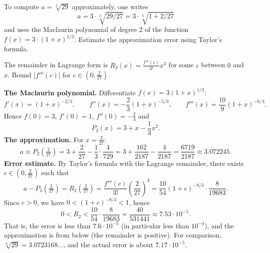 
\begin{question}
To compute $a=\sqrt[3]{29}$ approximately, one writes
\[ a=3\cdot\sqrt[3]{29/27}=3\cdot\sqrt[3]{1+2/27} \]
and uses the Maclaurin polynomial of degree 2 of the function $f(x)=3\cdot(1+x)^{1/3}$. Estimate the approximation error using Taylor's formula.
\end{question}

\begin{hint}
The remainder in Lagrange form is $R_2(x)=\frac{f'''(c)}{3!}x^3$ for some $c$ between $0$ and $x$. Bound $|f'''(c)|$ for $c\in(0,\frac2{27})$.
\end{hint}

\begin{solution}
\textbf{The Maclaurin polynomial.} Differentiate $f(x)=3(1+x)^{1/3}$:
\[ f'(x)=(1+x)^{-2/3},\qquad f''(x)=-\frac23(1+x)^{-5/3},\qquad f'''(x)=\frac{10}{9}(1+x)^{-8/3}. \]
Hence $f(0)=3$, $f'(0)=1$, $f''(0)=-\frac23$ and
\[ P_2(x)=3+x-\frac13x^2. \]
\textbf{The approximation.} For $x=\frac2{27}$:
\[ a\approx P_2\!\left(\tfrac2{27}\right)=3+\frac2{27}-\frac13\cdot\frac{4}{729}=3+\frac{162}{2187}-\frac{4}{2187}=\frac{6719}{2187}\approx3.072245. \]
\textbf{Error estimate.} By Taylor's formula with the Lagrange remainder, there exists $c\in(0,\frac2{27})$ such that
\[ a-P_2\!\left(\tfrac2{27}\right)=R_2\!\left(\tfrac2{27}\right)=\frac{f'''(c)}{3!}\left(\frac2{27}\right)^3=\frac{10}{54}(1+c)^{-8/3}\cdot\frac{8}{19683}. \]
Since $c>0$, we have $0<(1+c)^{-8/3}<1$, hence
\[ 0<R_2<\frac{10}{54}\cdot\frac{8}{19683}=\frac{40}{531441}\approx7.53\cdot10^{-5}. \]
That is, the error is less than $7.6\cdot10^{-5}$ (in particular less than $10^{-4}$), and the approximation is from below (the remainder is positive). For comparison, $\sqrt[3]{29}=3.0723168\ldots$, and the actual error is about $7.17\cdot10^{-5}$.
\end{solution}
